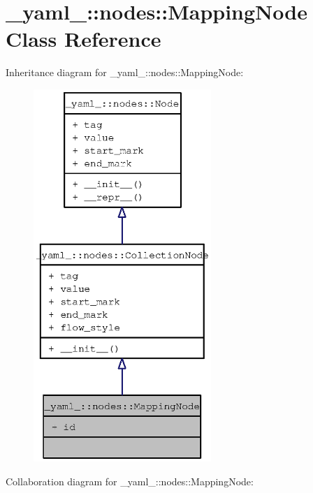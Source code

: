 \section{\_\-yaml\_\-::nodes::MappingNode Class Reference}
\label{class__yaml___1_1nodes_1_1MappingNode}
Inheritance diagram for \_\-yaml\_\-::nodes::MappingNode:\nopagebreak
\begin{figure}[H]
\begin{center}
\leavevmode
\includegraphics[height=400pt]{class__yaml___1_1nodes_1_1MappingNode__inherit__graph}
\end{center}
\end{figure}
Collaboration diagram for \_\-yaml\_\-::nodes::MappingNode:\nopagebreak
